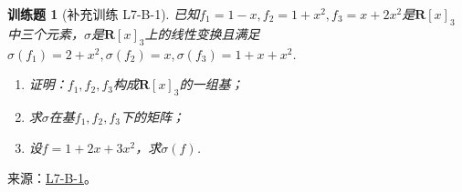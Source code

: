 \documentclass[UTF8,12pt,a4paper,fontset=fandol]{ctexart}
\newtheorem{exercise}{训练题}[section]
\begin{document}
\begin{exercise}[补充训练 L7-B-1]\label{prob:L7-B-1}
已知$f_1=1-x,f_2=1+x^2,f_3=x+2x^2$是$\mathbf{R}[x]_3$中三个元素，$\sigma$是$\mathbf{R}[x]_3$上的线性变换且满足$\sigma(f_1)=2+x^2,\sigma(f_2)=x,\sigma(f_3)=1+x+x^2$.
        \begin{enumerate}
            \item 证明：$f_1,f_2,f_3$构成$\mathbf{R}[x]_3$的一组基；

            \item 求$\sigma$在基$f_1,f_2,f_3$下的矩阵；

            \item 设$f=1+2x+3x^2$，求$\sigma(f)$.
        \end{enumerate}
\end{exercise}
\noindent 来源：\href{https://github.com/yhwu-is/Linear-Algebra-Left-Undone/blob/new/%E8%AE%B2%E4%B9%89/%E4%B8%93%E9%A2%98/7%20%E7%BA%BF%E6%80%A7%E6%98%A0%E5%B0%84%E7%9F%A9%E9%98%B5%E8%A1%A8%E7%A4%BA%E4%B8%8E%E7%9F%A9%E9%98%B5%E8%BF%90%E7%AE%97%E5%9F%BA%E7%A1%80.tex}{L7-B-1}。
\end{document}
